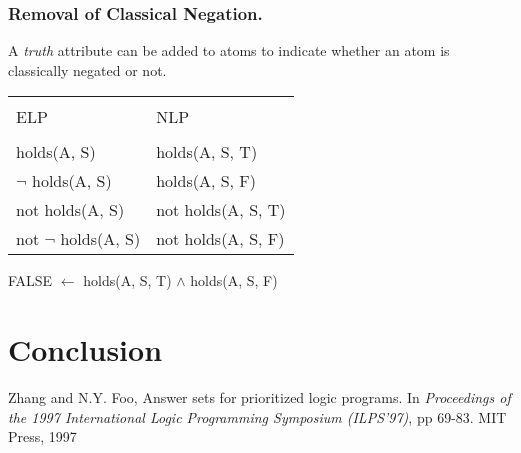 \documentclass{llncs}
\begin{document}
      \subsubsection{Removal of Classical Negation.}
        A \emph{truth} attribute can be added to atoms to indicate whether
        an atom is classically negated or not.

        \vspace{0.65cm}

        \begin{table}
          \begin{tabular}{ll}
            \hline \\
            ELP & NLP \\
            \hline \\
            holds(A, S) & holds(A, S, T) \\
            $\lnot$ holds(A, S) & holds(A, S, F) \\
            not holds(A, S) & not holds(A, S, T) \\
            not $\lnot$ holds(A, S) & not holds(A, S, F) \\
            \hline
          \end{tabular}
        \end{table}

        FALSE $\leftarrow$ holds(A, S, T) $\land$ holds(A, S, F)

  \section{Conclusion}

  \begin{thebibliography}{5}

      Zhang and N.Y. Foo,
      Answer sets for prioritized logic programs.
      In {\em Proceedings of the 1997 International Logic Programming
      Symposium (ILPS'97)},
      pp 69-83. 
      MIT Press, 1997

  \end{thebibliography}
\end{document}
